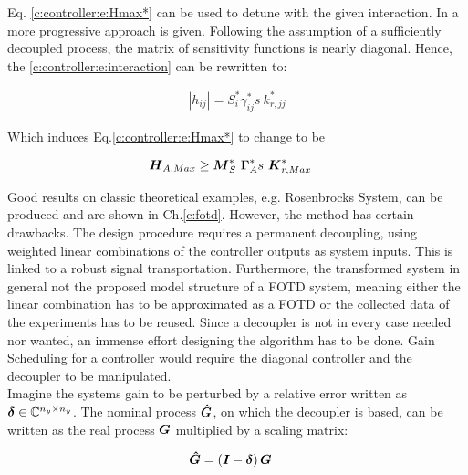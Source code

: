 Eq. \ref{c:controller:e:Hmax*} can be used to detune with the given interaction. In \cite[p.357]{Astrom2006} a more progressive approach is given. Following the assumption of a sufficiently decoupled process, the matrix of sensitivity functions is nearly diagonal. Hence, the \ref{c:controller:e:interaction} can be rewritten to:

\begin{align}
\left|h_{ij} \right| = S_i^* \gamma_{ij}^*s~k_{r,jj}^*
\label{c:controller:e:ProgressiveInteraction}
\end{align}

Which induces Eq.\ref{c:controller:e:Hmax*} to change to be

\begin{align}
\begin{split}
\mbox{\boldmath$H$}_{A,Max} &\geq \mbox{\boldmath$M$}_S^*~ \mbox{\boldmath$\Gamma$}_A^*s~ \mbox{\boldmath$K$}_{r,Max}^* 
\end{split}
\label{c:controller:e:ProgressiveHmax*}
\end{align}

Good results on classic theoretical examples, e.g. Rosenbrocks System, can be produced and are shown in Ch.\ref{c:fotd}. However, the method has certain drawbacks. The design procedure requires a permanent decoupling, using weighted linear combinations of the controller outputs as system inputs. This is linked to a robust signal transportation. Furthermore, the transformed system in general not the proposed model structure of a FOTD system, meaning either the linear combination has to be approximated as a FOTD or the collected data of the experiments has to be reused. Since a decoupler is not in every case needed nor wanted, an immense effort designing the algorithm has to be done. Gain Scheduling for a controller would require the diagonal controller and the decoupler to be manipulated.\\

Imagine the systems gain to be perturbed by a relative error written as $\mbox{\boldmath$\delta$} \in \mathbb{C}^{n_y \times n_y}$. The nominal process $\mbox{\boldmath$\hat{G}$}$, on which the decoupler is based, can be written as the real process $\mbox{\boldmath$G$}$ multiplied by a scaling matrix:

\begin{align}
\begin{split}
\mbox{\boldmath$\hat{G}$} &= \left( \mbox{\boldmath$I$} - \mbox{\boldmath$\delta$} \right) \mbox{\boldmath$G$}
\end{split}
\label{c:controller:e:PertubedGain}
\end{align}

